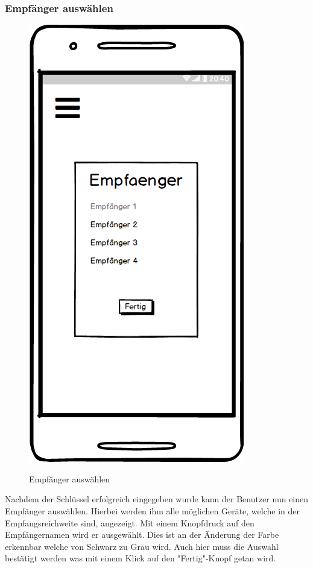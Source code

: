 \subsubsection{Empfänger auswählen}
\begin{figure}[H]
	\centering
	\includegraphics[width=.5\linewidth]{pictures/Mobile/Empfaenger.png}\
	\caption{Empfänger auswählen}
\end{figure}
Nachdem der Schlüssel erfolgreich eingegeben wurde kann der Benutzer nun einen Empfänger auswählen. Hierbei werden ihm alle möglichen Geräte, welche in der Empfangsreichweite sind, angezeigt. Mit einem Knopfdruck auf den Empfängernamen wird er ausgewählt. Dies ist an der Änderung der Farbe erkennbar welche von Schwarz zu Grau wird. Auch hier muss die Auswahl bestätigt werden was mit einem Klick auf den "Fertig"-Knopf getan wird.
